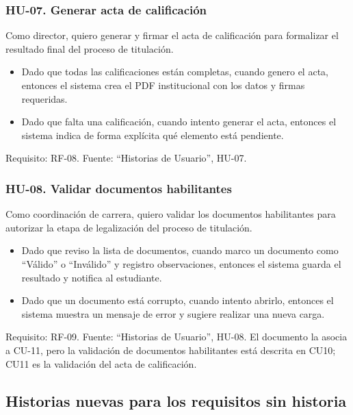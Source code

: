 \subsubsection*{HU-07. Generar acta de calificación}
Como director, quiero generar y firmar el acta de calificación para formalizar el resultado final del proceso de titulación.
\begin{itemize}
  \item Dado que todas las calificaciones están completas, cuando genero el acta, entonces el sistema crea el PDF institucional con los datos y firmas requeridas.
  \item Dado que falta una calificación, cuando intento generar el acta, entonces el sistema indica de forma explícita qué elemento está pendiente.
\end{itemize}
Requisito: RF-08. Fuente: \enquote{Historias de Usuario}, HU-07.

\subsubsection*{HU-08. Validar documentos habilitantes}
Como coordinación de carrera, quiero validar los documentos habilitantes para autorizar la etapa de legalización del proceso de titulación.
\begin{itemize}
  \item Dado que reviso la lista de documentos, cuando marco un documento como \enquote{Válido} o \enquote{Inválido} y registro observaciones, entonces el sistema guarda el resultado y notifica al estudiante.
  \item Dado que un documento está corrupto, cuando intento abrirlo, entonces el sistema muestra un mensaje de error y sugiere realizar una nueva carga.
\end{itemize}
Requisito: RF-09. Fuente: \enquote{Historias de Usuario}, HU-08. El documento la asocia a CU-11, pero la validación de documentos habilitantes está descrita en CU10; CU11 es la validación del acta de calificación.

\subsection{Historias nuevas para los requisitos sin historia}

